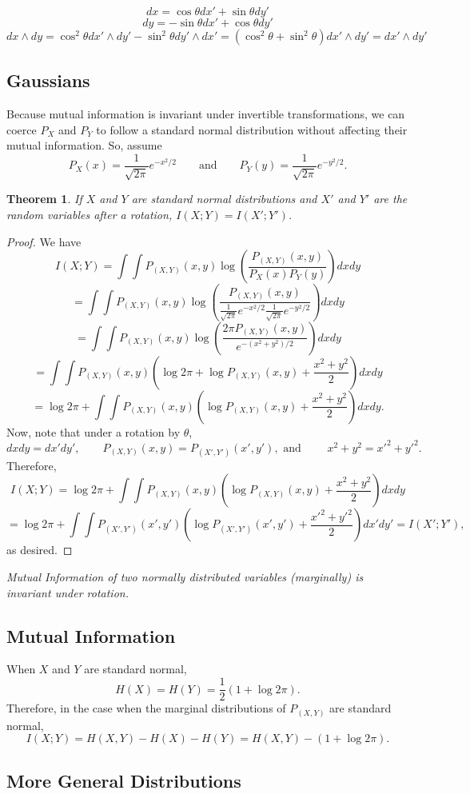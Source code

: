 \documentclass[12pt]{article}
\newtheorem{theorem}{Theorem}
\begin{document}
$$dx = \cos \theta dx' + \sin \theta dy'$$
$$dy = - \sin \theta dx' + \cos \theta dy' $$
$$dx \wedge dy = \cos^2\theta dx' \wedge dy' - \sin^2\theta dy' \wedge dx' = (\cos^2\theta + \sin^2\theta)dx' \wedge dy' = dx' \wedge dy'$$

\subsection{Gaussians}

Because mutual information is invariant under invertible transformations, we can coerce $P_X$ and $P_Y$ to follow a standard normal distribution without affecting their mutual information. 
So, assume
$$P_X(x) = \frac{1}{\sqrt{2\pi}}e^{-x^2/2} 
\qquad \text{and} \qquad
P_Y(y) = \frac{1}{\sqrt{2\pi}}e^{-y^2/2}.$$

\begin{theorem}\label{MI rotations}
    If $X$ and $Y$ are standard normal distributions and $X'$ and $Y'$ are the random variables after a rotation, $I(X;Y) = I(X';Y')$.
\end{theorem}

\begin{proof}
We have
$$I(X;Y) = \int\int P_{(X,Y)}(x,y)\log\left(\frac{P_{(X,Y)}(x,y)}{P_X(x)P_Y(y)}\right)dxdy$$
$$= \int\int P_{(X,Y)}(x,y)\log\left(\frac{P_{(X,Y)}(x,y)}{\frac{1}{\sqrt{2\pi}}e^{-x^2/2}\frac{1}{\sqrt{2\pi}}e^{-y^2/2}}\right)dxdy$$
$$= \int\int P_{(X,Y)}(x,y)\log\left(\frac{2\pi P_{(X,Y)}(x,y)}{e^{-(x^2+y^2)/2}}\right)dxdy$$
$$= \int\int P_{(X,Y)}(x,y)\left(\log 2\pi + \log P_{(X,Y)}(x,y) + \frac{x^2 + y^2}{2}\right)dxdy$$
$$= \log 2\pi + \int\int P_{(X,Y)}(x,y)\left(\log P_{(X,Y)}(x,y) + \frac{x^2 + y^2}{2}\right)dxdy.$$
Now, note that under a rotation by $\theta$,
$$dxdy = dx'dy', \qquad P_{(X,Y)}(x,y) = P_{(X',Y')}(x',y'), \text{ and }\qquad x^2 + y^2 = x'^2 + y'^2.$$
Therefore,
$$I(X;Y) = \log 2\pi + \int\int P_{(X,Y)}(x,y)\left(\log P_{(X,Y)}(x,y) + \frac{x^2 + y^2}{2}\right)dxdy$$
$$=\log 2\pi + \int\int P_{(X',Y')}(x',y')\left(\log P_{(X',Y')}(x',y') + \frac{x'^2 + y'^2}{2}\right)dx'dy' = I(X';Y'),$$
as desired.
\end{proof}

\begin{center}
{\it Mutual Information of two normally distributed variables (marginally) is invariant under rotation.}
\end{center}

\subsection{Mutual Information}

When $X$ and $Y$ are standard normal, 
$$H(X) = H(Y) = \frac{1}{2}(1 + \log2\pi).$$ 
Therefore, in the case when the marginal distributions of $P_{(X,Y)}$ are standard normal,
$$I(X;Y) = H(X,Y) - H(X) - H(Y) = H(X,Y) - (1 + \log 2 \pi).$$

\subsection{More General Distributions}
\end{document}
